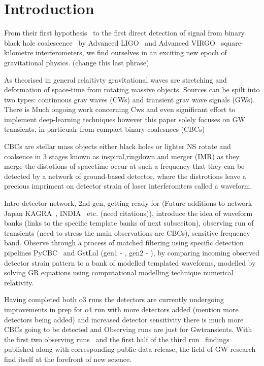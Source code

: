 \documentclass[aps,superscriptaddress,twocolumn,nopreprintnumbers,floatfix,groupedaddress]{revtex4-1}
\begin{document}
\section{Introduction}\label{intro}

From their first hypothesis~\cite{einstein1} to the first direct detection of signal from binary black hole coalescence~\cite{abbott2016observation} by Advanced LIGO~\cite{advancedLIGO} and Advanced VIRGO~\cite{advancedVIRGO} square-kilometre interferometers, we find ourselves in an exciting new epoch of gravitational physics. (change this last phrase).

As theorised in general relaitivty gravitational waves are stretching and deformation of space-time from rotating massive objects. Sources can be spilt into two types: continuous grav waves (CWs) and transient grav wave signals (GWs). There is Much ongoing work concerning Cws \cite{bayley2019soap} and even significant effort to implement deep-learning techniques \cite{bayley2020soapML,cwml2019} however this paper solely focuses on GW transients, in particualr from compact binary coalesnecs (CBCs)

CBCs are stellar mass objects either black holes or lighter NS rotate and coalsence in 3 stages known as inspiral,ringdown and merger (IMR) as they merge the distotions of spacetime occur at such a frequency that they can be detected by a network of ground-based detector, where the distrotions leave a precious impriment on detector strain of laser interferomters called a waveform. 

Intro detector network, 2nd gen, getting ready for (Future additions to network – Japan KAGRA~\cite{kagra}, INDIA~\cite{UNNIKRISHNAN_2013} etc. (need citations)), introduce the idea of waveform banks (links to the specific template banks of next subseciton), observing run of transients (need to stress the main observations are CBCs), sensitive frequency band. Observe through a process of matched filtering using specific detection pipelines PyCBC~\cite{pycbc2016} and GstLal (gen1 - \cite{gstlal_gen1_2017}, gen2 - \cite{gstlal_gen2_2019}), by comparing incoming observed detector strain pattern to a bank of modelled templated waveforms, modelled by solving GR equations using computational modelling technique numerical relativity. 

Having completed both o3 runs the detectors are currently undergoing improvements in prep for o4 run with more detectors added (mention more detectors being added) and increased detector sensitivity there is much more CBCs going to be detected and Observing runs are just for Gwtransients. With the first two observing runs~\cite{BBHo1,gwtc1} and the first half of the third run~\cite{gwtc2} findings published along with corresponding public data release, the field of GW research find itself at the forefront of new science. 
\end{document}
